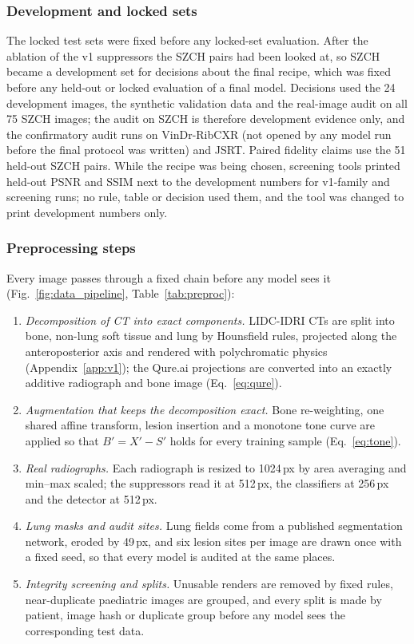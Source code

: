 \subsubsection{Development and locked sets}
The locked test sets were fixed before any locked-set evaluation. After the ablation of the v1 suppressors the SZCH pairs had been looked
at, so SZCH became a development set for decisions about the final recipe, which was fixed before any held-out or locked evaluation of a
final model. Decisions used the 24 development images, the synthetic validation data and the real-image audit on all 75 SZCH images; the
audit on SZCH is therefore development evidence only, and the confirmatory audit runs on VinDr-RibCXR (not opened by any model run before
the final protocol was written) and JSRT. Paired fidelity claims use the 51 held-out SZCH pairs. While the recipe was being chosen,
screening tools printed held-out PSNR and SSIM next to the development numbers for v1-family and screening runs; no rule, table or decision
used them, and the tool was changed to print development numbers only.

\subsubsection{Preprocessing steps}
\label{sec:m-preproc}
Every image passes through a fixed chain before any model sees it (Fig.~\ref{fig:data_pipeline}, Table~\ref{tab:preproc}):
\begin{enumerate}
\item \emph{Decomposition of CT into exact components.} LIDC-IDRI CTs are split into bone, non-lung soft tissue and lung by Hounsfield
 rules, projected along the anteroposterior axis and rendered with polychromatic physics (Appendix~\ref{app:v1}); the Qure.ai projections
 are converted into an exactly additive radiograph and bone image (Eq.~\eqref{eq:qure}).
\item \emph{Augmentation that keeps the decomposition exact.} Bone re-weighting, one shared affine transform, lesion insertion and a
 monotone tone curve are applied so that $B'=X'-S'$ holds for every training sample (Eq.~\eqref{eq:tone}).
\item \emph{Real radiographs.} Each radiograph is resized to 1024\,px by area averaging and min--max scaled; the suppressors read it at
 512\,px, the classifiers at 256\,px and the detector at 512\,px.
\item \emph{Lung masks and audit sites.} Lung fields come from a published segmentation network, eroded by 49\,px, and six lesion sites
 per image are drawn once with a fixed seed, so that every model is audited at the same places.
\item \emph{Integrity screening and splits.} Unusable renders are removed by fixed rules, near-duplicate paediatric images are grouped, and
 every split is made by patient, image hash or duplicate group before any model sees the corresponding test data.
\end{enumerate}

